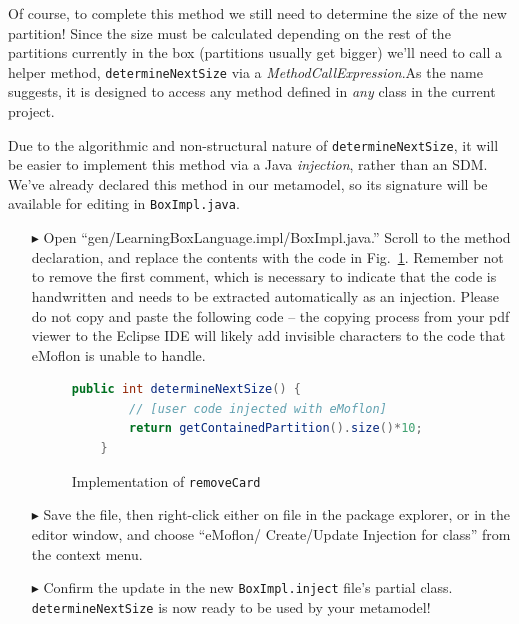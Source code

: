 Of course, to complete this method we still need to determine the size of the new partition! Since the size must be calculated depending on the
rest of the partitions currently in the box (partitions usually get bigger) we'll need to call a helper method, \texttt{determineNextSize} via a
\emph{MethodCallExpression}.As the name suggests, it is designed to access any method defined in \emph{any} class in the current project.

Due to the algorithmic and non-structural nature of \texttt{determineNextSize}, it will be easier to implement this method via a Java \emph{injection}, rather
than an SDM. We've already declared this method in our metamodel, so its signature will be available for editing in \texttt{BoxImpl.java}.

\begin{itemize}

\item[$\blacktriangleright$] Open ``gen/LearningBoxLanguage.impl/BoxImpl.java.'' Scroll to the method declaration, and replace the contents with the code in
Fig.~\ref{code:determineNextSize_impl}. Remember not to remove the first comment, which is necessary to indicate that the code is handwritten and needs to be
extracted automatically as an injection. Please do not copy and paste the following code -- the copying process from your pdf viewer to the Eclipse IDE
will likely add invisible characters to the code that eMoflon is unable to handle.

\begin{figure}[htbp]
        \centering
        \begin{lstlisting}[language=Java, keywordstyle={\bfseries\color{purple}}, backgroundcolor=\color{white}]
    public int determineNextSize() {
    	// [user code injected with eMoflon]
        return getContainedPartition().size()*10;
    }
        \end{lstlisting}
        \caption{Implementation of \texttt{removeCard}}
        \label{code:determineNextSize_impl}
\end{figure}


\item[$\blacktriangleright$] Save the file, then right-click either on file in the package explorer, or in the editor window, and choose ``eMoflon/
Create/Update Injection for class'' from the context menu. 

\item[$\blacktriangleright$] Confirm the update in the new \texttt{BoxImpl.inject} file's partial class. \texttt{determineNextSize} is now ready to be used by
your metamodel!


\end{itemize}




